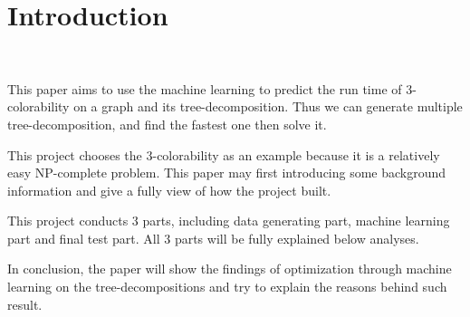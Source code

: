 \section{Introduction}~\label{sec.introduction}

This paper aims to use the machine learning to predict the run time of 3-colorability on a graph and its tree-decomposition. Thus we can generate multiple tree-decomposition, and find the fastest one then solve it.

This project chooses the 3-colorability as an example because it is a relatively easy NP-complete problem. This paper may first introducing some background information and give a fully view of how the project built.

This project conducts 3 parts, including data generating part, machine learning part and final test part. All 3 parts will be fully explained below analyses.

In conclusion, the paper will show the findings of optimization through machine learning on the tree-decompositions and try to explain the reasons behind such result.